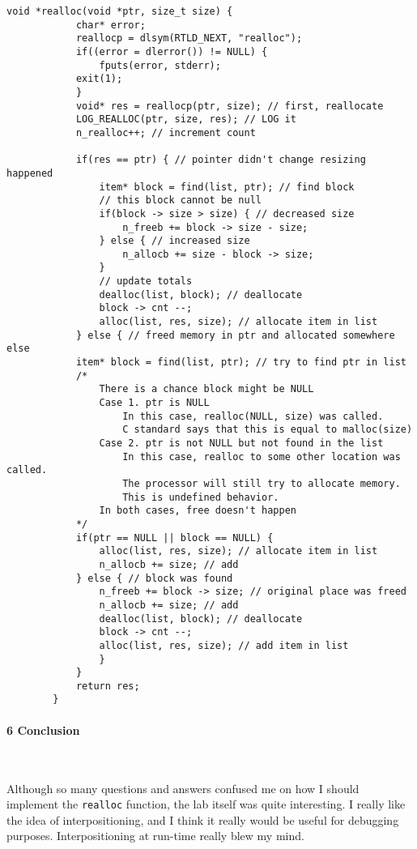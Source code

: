 \documentclass[12pt]{report}
\begin{document}
\begin{center}
	\begin{lstlisting}[style=CStyle]
		void *realloc(void *ptr, size_t size) {
			char* error;
			reallocp = dlsym(RTLD_NEXT, "realloc");
			if((error = dlerror()) != NULL) {
				fputs(error, stderr);
			exit(1);
			}
			void* res = reallocp(ptr, size); // first, reallocate
			LOG_REALLOC(ptr, size, res); // LOG it
			n_realloc++; // increment count
		
			if(res == ptr) { // pointer didn't change resizing happened
				item* block = find(list, ptr); // find block
				// this block cannot be null
				if(block -> size > size) { // decreased size
					n_freeb += block -> size - size;
				} else { // increased size
					n_allocb += size - block -> size;
				}
				// update totals
				dealloc(list, block); // deallocate
				block -> cnt --;
				alloc(list, res, size); // allocate item in list
			} else { // freed memory in ptr and allocated somewhere else
			item* block = find(list, ptr); // try to find ptr in list
			/*
				There is a chance block might be NULL
				Case 1. ptr is NULL
					In this case, realloc(NULL, size) was called.
					C standard says that this is equal to malloc(size)
				Case 2. ptr is not NULL but not found in the list
					In this case, realloc to some other location was called.
					The processor will still try to allocate memory.
					This is undefined behavior.
				In both cases, free doesn't happen
			*/
			if(ptr == NULL || block == NULL) {
				alloc(list, res, size); // allocate item in list
				n_allocb += size; // add
			} else { // block was found
				n_freeb += block -> size; // original place was freed
				n_allocb += size; // add
				dealloc(list, block); // deallocate
				block -> cnt --;
				alloc(list, res, size); // add item in list
				}
			}
			return res;
		}\end{lstlisting}
\end{center}

\paragraph*{\large 6 Conclusion}~

Although so many questions and answers confused me on how I should implement the \texttt{realloc} function, the lab itself was quite interesting. I really like the idea of interpositioning, and I think it really would be useful for debugging purposes. Interpositioning at run-time really blew my mind.
 
\end{document}
